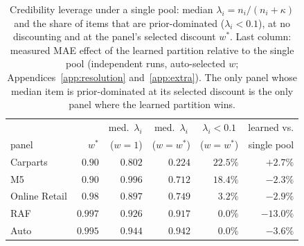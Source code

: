 \documentclass[twocolumn,10pt]{article}
\begin{document}
\begin{table}[t]
\centering
\caption{Credibility leverage under a single pool: median
$\lambda_i=n_i/(n_i+\kappa)$ and the share of items that are
prior-dominated ($\lambda_i<0.1$), at no discounting and at the
panel's selected discount $w^{*}$. Last column: measured MAE effect of
the learned partition relative to the single pool (independent runs,
auto-selected $w$; Appendices~\ref{app:resolution} and~\ref{app:extra}). The only panel whose
median item is prior-dominated at its selected discount is the only
panel where the learned partition wins.}
\label{tab:leverage}
\begin{tabular}{lrrrrr}
\toprule
& & \multicolumn{1}{c}{med.\ $\lambda_i$} & \multicolumn{1}{c}{med.\ $\lambda_i$}
& \multicolumn{1}{c}{$\lambda_i{<}0.1$} & learned vs.\\
panel & $w^{*}$ & ($w{=}1$) & ($w{=}w^{*}$) & ($w{=}w^{*}$) & single pool\\
\midrule
Carparts & $0.90$ & $0.802$ & $\mathbf{0.224}$ & $22.5\%$ & $\mathbf{+2.7\%}$\\
M5 & $0.90$ & $0.996$ & $0.712$ & $18.4\%$ & $-2.3\%$\\
Online Retail & $0.98$ & $0.897$ & $0.749$ & $3.2\%$ & $-2.9\%$\\
RAF & $0.997$ & $0.926$ & $0.917$ & $0.0\%$ & $-13.0\%$\\
Auto & $0.995$ & $0.944$ & $0.942$ & $0.0\%$ & $-3.6\%$\\
\bottomrule
\end{tabular}
\end{table}
\end{document}
